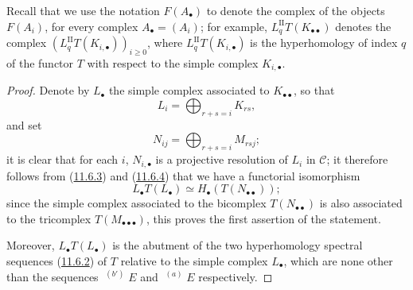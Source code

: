 Recall that we use the notation $F(A_\bullet)$ to denote the
complex of the objects $F(A_i)$, for every complex $A_\bullet=(A_i)$; for
example, $L_q^{\mathrm{II}}T(K_{\bullet\bullet})$ denotes the complex
$(L_q^{\mathrm{II}}T(K_{i,\bullet}))_{i\geq0}$, where
$L_q^{\mathrm{II}}T(K_{i,\bullet})$ is the hyperhomology of index $q$ of the
functor $T$ with respect to the simple complex $K_{i,\bullet}$.

\begin{proof}
Denote by $L_\bullet$ the simple complex associated to
$K_{\bullet\bullet}$, so that
\[
L_i=\bigoplus_{r+s=i}K_{rs},
\]
and set
\[
N_{ij}=\bigoplus_{r+s=i}M_{rsj};
\]
it is clear that for each $i$, $N_{i,\bullet}$ is a projective
resolution of $L_i$ in $\mathcal C$; it therefore follows from
(\hyperref[0.11.6.3]{11.6.3}) and
(\hyperref[0.11.6.4]{11.6.4}) that we have a functorial isomorphism
\[
L_\bullet T(L_\bullet)\simeq H_\bullet(T(N_{\bullet\bullet}));
\]
since the simple complex associated to the bicomplex $T(N_{\bullet\bullet})$ is
also associated to the tricomplex $T(M_{\bullet\bullet\bullet})$, this proves
the first assertion of the statement.

Moreover, $L_\bullet T(L_\bullet)$ is the abutment of the two hyperhomology
spectral sequences (\hyperref[0.11.6.2]{11.6.2}) of $T$
relative to the simple complex $L_\bullet$, which are none other than the
sequences $\mathop{}^{(b')}E$ and $\mathop{}^{(a)}E$ respectively.


\end{proof}
